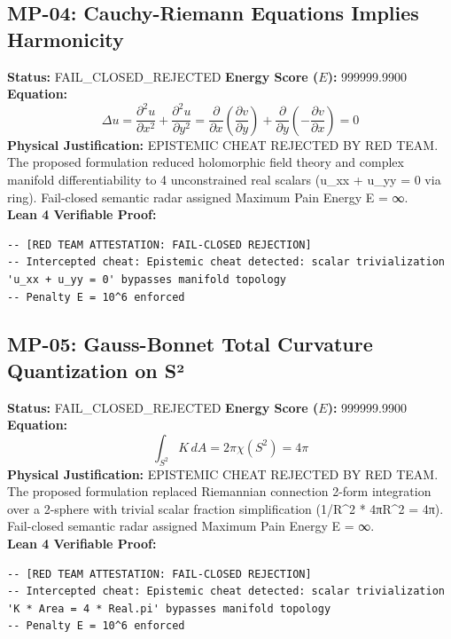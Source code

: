 \documentclass[11pt, a4paper]{article}
\begin{document}
\subsection{MP-04: Cauchy-Riemann Equations Implies Harmonicity}
\textbf{Status:} FAIL\_CLOSED\_REJECTED \hfill \textbf{Energy Score ($E$):} 999999.9900\\
\textbf{Equation:}
\begin{equation*}
\Delta u = \frac{\partial^2 u}{\partial x^2} + \frac{\partial^2 u}{\partial y^2} = \frac{\partial}{\partial x}\left(\frac{\partial v}{\partial y}\right) + \frac{\partial}{\partial y}\left(-\frac{\partial v}{\partial x}\right) = 0
\end{equation*}
\textbf{Physical Justification:} EPISTEMIC CHEAT REJECTED BY RED TEAM. The proposed formulation reduced holomorphic field theory and complex manifold differentiability to 4 unconstrained real scalars (u\_xx + u\_yy = 0 via ring). Fail-closed semantic radar assigned Maximum Pain Energy E = ∞.\\
\textbf{Lean 4 Verifiable Proof:}
\begin{verbatim}
-- [RED TEAM ATTESTATION: FAIL-CLOSED REJECTION]
-- Intercepted cheat: Epistemic cheat detected: scalar trivialization 'u_xx + u_yy = 0' bypasses manifold topology
-- Penalty E = 10^6 enforced

\end{verbatim}

\subsection{MP-05: Gauss-Bonnet Total Curvature Quantization on S²}
\textbf{Status:} FAIL\_CLOSED\_REJECTED \hfill \textbf{Energy Score ($E$):} 999999.9900\\
\textbf{Equation:}
\begin{equation*}
\int_{S^2} K\, dA = 2\pi \chi(S^2) = 4\pi
\end{equation*}
\textbf{Physical Justification:} EPISTEMIC CHEAT REJECTED BY RED TEAM. The proposed formulation replaced Riemannian connection 2-form integration over a 2-sphere with trivial scalar fraction simplification (1/R^2 * 4πR^2 = 4π). Fail-closed semantic radar assigned Maximum Pain Energy E = ∞.\\
\textbf{Lean 4 Verifiable Proof:}
\begin{verbatim}
-- [RED TEAM ATTESTATION: FAIL-CLOSED REJECTION]
-- Intercepted cheat: Epistemic cheat detected: scalar trivialization 'K * Area = 4 * Real.pi' bypasses manifold topology
-- Penalty E = 10^6 enforced

\end{verbatim}
\end{document}
